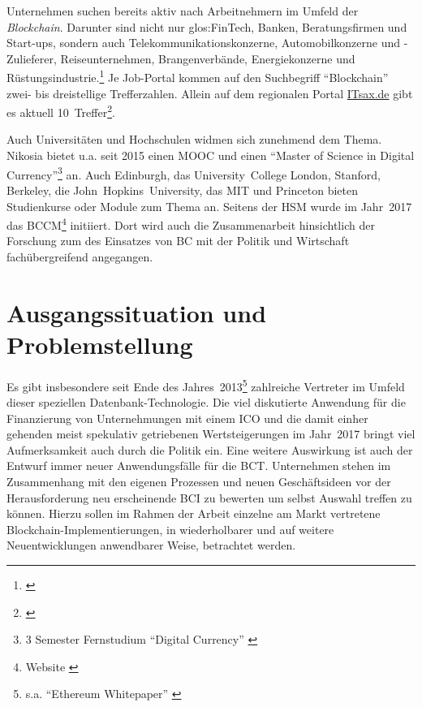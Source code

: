 Unternehmen suchen bereits aktiv nach Arbeitnehmern im Umfeld der \emph{Blockchain}.
Darunter sind nicht nur \gls{glos:FinTech}, Banken, Beratungsfirmen und Start-ups, sondern auch Telekommunikationskonzerne, Automobilkonzerne und -Zulieferer, Reiseunternehmen, Brangenverbände, Energiekonzerne und Rüstungsindustrie.\footnote{\cite{w:jobsearch-bc-stepstone}}
Je Job-Portal kommen auf den Suchbegriff \enquote{Blockchain} zwei- bis dreistellige Trefferzahlen.
Allein auf dem regionalen Portal \href{https://www.itsax.de/}{ITsax.de} gibt es aktuell 10~Treffer\footnote{\cite{w:jobsearch-bc-itsax}}.

Auch Universitäten und Hochschulen widmen sich zunehmend dem Thema. Nikosia bietet u.a. seit 2015 einen \gls{MOOC} und einen \enquote{Master of Science in Digital Currency}\footnote{3 Semester Fernstudium \enquote{Digital Currency} \autocite{w:unic-master-dc}} an. Auch Edinburgh, das \mbox{University College} London, Stanford, Berkeley, die \mbox{John Hopkins University}, das \gls{MIT} und Princeton bieten Studienkurse oder Module zum Thema an. 
Seitens der \gls{HSM} wurde im Jahr~2017 das \gls{BCCM}\footnote{Website \autocite{w:bccm}} initiiert. Dort wird auch die Zusammenarbeit hinsichtlich der Forschung zum des Einsatzes von \gls{BC} mit der Politik und Wirtschaft fachübergreifend angegangen.

\newpage
\section{Ausgangssituation und Problemstellung}\label{sec:problemstellung}

Es gibt insbesondere seit Ende des Jahres~2013\footnote{s.a. \enquote{Ethereum Whitepaper} \autocite{p:ethereum}} zahlreiche Vertreter im Umfeld dieser speziellen Datenbank-Technologie.
Die viel diskutierte Anwendung für die Finanzierung von Unternehmungen mit einem \gls{ICO} und die damit einher gehenden meist spekulativ getriebenen Wertsteigerungen im Jahr~2017 bringt viel Aufmerksamkeit auch durch die Politik ein.
Eine weitere Auswirkung ist auch der Entwurf immer neuer Anwendungsfälle für die \gls{BCT}.
Unternehmen stehen im Zusammenhang mit den eigenen Prozessen und neuen Geschäftsideen vor der Herausforderung neu erscheinende \gls{BCI} zu bewerten um selbst Auswahl treffen zu können.
Hierzu sollen im Rahmen der Arbeit einzelne am Markt vertretene Blockchain-Implementierungen, in wiederholbarer und auf weitere Neuentwicklungen anwendbarer Weise, betrachtet werden.

